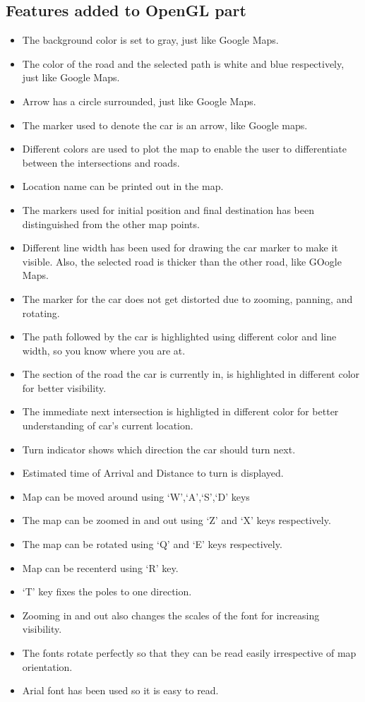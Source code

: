 \documentclass{article}
\begin{document}
\subsection{Features added to OpenGL part}
\begin{itemize}
	\item The background color is set to gray, just like Google Maps.
	\item The color of the road and the selected path is white and blue respectively, just like Google Maps.
	\item Arrow has a circle surrounded, just like Google Maps.
	\item The marker used to denote the car is an arrow, like Google maps.
	\item Different colors are used to plot the map to enable the user to differentiate between the intersections and roads.
	\item Location name can be printed out in the map.
        \item The markers used for initial position and final destination has been distinguished from the other map points.
	\item Different line width has been used for drawing the car marker to make it visible. Also, the selected road is thicker than the other road, like GOogle Maps.
	\item The marker for the car does not get distorted due to zooming, panning, and rotating.
        \item The path followed by the car is highlighted using different color and line width, so you know where you are at.
	\item The section of the road the car is currently in, is highlighted in different color for better visibility.
	\item The immediate next intersection is highligted in different color for better understanding of car's current location.
	\item Turn indicator shows which direction the car should turn next.
	\item Estimated time of Arrival and Distance to turn is displayed.
	\item Map can be moved around using `W',`A',`S',`D' keys
	\item The map can be zoomed in and out using `Z' and `X' keys respectively.
	\item The map can be rotated using `Q' and `E' keys respectively.
	\item Map can be recenterd using `R' key.
	\item `T' key fixes the poles to one direction.
	\item Zooming in and out also changes the scales of the font for increasing visibility.
	\item The fonts rotate perfectly so that they can be read easily irrespective of map orientation.	 
	\item Arial font has been used so it is easy to read. 
\end{itemize}
\end{document}

